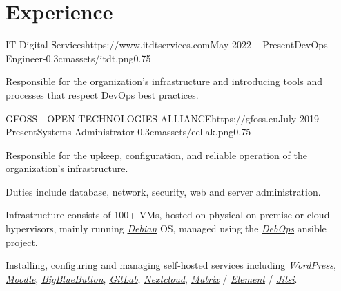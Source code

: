 \documentclass{mycv}
\begin{document}
	\section{Experience}

	\begin{EntryDatedLogo}{IT Digital Services}{https://www.itdtservices.com}{May 2022 -- Present}{DevOps Engineer}{-0.3cm}{assets/itdt.png}{0.75}
		\vspace{-0.2cm}
		\begin{Itemize}
			\item Responsible for the organization's infrastructure and introducing tools and processes that respect DevOps best practices.
		\end{Itemize}
	\end{EntryDatedLogo}

	\vspace{0.75cm}

	\begin{EntryDatedLogo}{GFOSS - OPEN TECHNOLOGIES ALLIANCE}{https://gfoss.eu}{July 2019 -- Present}{Systems Administrator}{-0.3cm}{assets/eellak.png}{0.75}
		\vspace{-0.2cm}
		\begin{Itemize}
			\item Responsible for the upkeep, configuration, and reliable operation of the organization's infrastructure.
			\item Duties include database, network, security, web and server administration.
			\item Infrastructure consists of 100+ VMs, hosted on physical on-premise or cloud hypervisors, mainly running \href{https://www.debian.org}{\textit{Debian}} OS, managed using the \href{https://debops.org}{\textit{DebOps}} ansible project.
			\item Installing, configuring and managing self-hosted services including \href{https://wordpress.com}{\textit{WordPress}}, \href{https://moodle.org}{\textit{Moodle}}, \href{https://bigbluebutton.org}{\textit{BigBlueButton}}, \href{https://about.gitlab.com/install/}{\textit{GitLab}}, \href{https://nextcloud.com}{\textit{Nextcloud}}, \href{https://matrix.org}{\textit{Matrix}} / \href{https://element.io}{\textit{Element}} / \href{https://jitsi.org}{\textit{Jitsi}}.
		\end{Itemize}
	\end{EntryDatedLogo}
\end{document}
